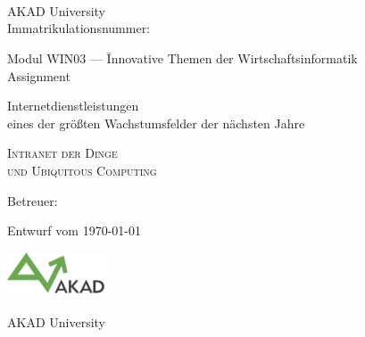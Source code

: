 

\begin{titlepage}


\vspace{5cm}

\Name \\ 
\Strasse \\ 
\PlzOrt\\ 
\href{mailto:\Email}{\Email}

AKAD University\\
Immatrikulationsnummer: \Immatrikulationsnummer

\vfill

\begin{tabbing}
Modul WIN03 --- \=Innovative Themen der Wirtschaftsinformatik\\ 
				\>Assignment
\end{tabbing}

Internetdienstleistungen\\
eines der größten Wachstumsfelder der nächsten Jahre

\LARGE
\textsc{Intranet der Dinge \\und Ubiquitous Computing}\\

\vfill

\normalsize

Betreuer: \Betreuer

Entwurf vom \today %

\vfill

\includegraphics[width=3cm]{akad_logo.png}

AKAD University

\end{titlepage}

\normalsize
